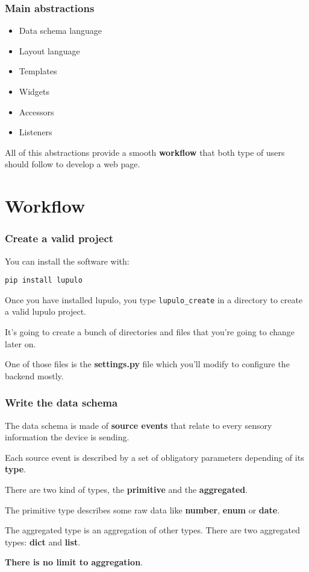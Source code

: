 \documentclass{beamer}
\begin{document}
    \begin{frame}
        \frametitle{Main abstractions}
        \begin{itemize}
            \item \color{blue} Data schema language
            \item Layout language
            \item Templates
            \item \color{purple} Widgets
            \item Accessors
            \item Listeners
        \end{itemize}

        All of this abstractions provide a smooth \textbf{workflow} that both
        type of users should follow to develop a web page.
    \end{frame}

    \section{Workflow}
    \begin{frame}
        \frametitle{Create a valid project}
        You can install the software with:
            
        \texttt{pip install lupulo}

        Once you have installed lupulo, you type \texttt{lupulo\_create} in a
        directory to create a valid lupulo project.

        It's going to create a bunch of directories and files that you're going
        to change later on.

        One of those files is the \textbf{settings.py} file which you'll modify
        to configure the backend mostly.
    \end{frame}

    \begin{frame}
        \frametitle{Write the data schema}

        The data schema is made of \textbf{source events} that relate to every
        sensory information the device is sending.

        Each source event is described by a set of obligatory parameters
        depending of its \textbf{type}.

        There are two kind of types, the \textbf{primitive} and the
        \textbf{aggregated}.

        The primitive type describes some raw data like \textbf{number}, 
        \textbf{enum} or \textbf{date}.

        The aggregated type is an aggregation of other types. There are two
        aggregated types: \textbf{dict} and \textbf{list}.

        \textbf{There is no limit to aggregation}.
    \end{frame}
\end{document}
